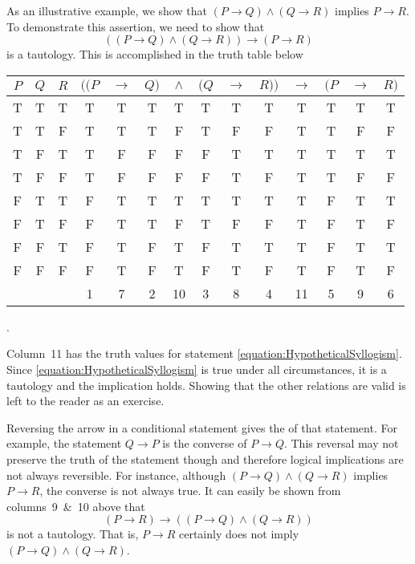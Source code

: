 As an illustrative example, we show that $(P \rightarrow Q) \wedge (Q \rightarrow R)$ implies $P \rightarrow R$.
To demonstrate this assertion, we need to show that
\begin{equation} \label{equation:HypotheticalSyllogism}
((P \rightarrow Q) \wedge (Q \rightarrow R)) \rightarrow (P \rightarrow R)
\end{equation}
is a tautology.
This is accomplished in the truth table below
\begin{center}
\begin{tabular}{|c|c|c|ccccccccccc|}
\hline
$P$ & $Q$ & $R$
& $((P$ & $\rightarrow$ & $Q)$ & $\wedge$ & $(Q$ & $\rightarrow$ & $R))$ & $\rightarrow$ & $(P$ & $\rightarrow$ & $R)$ \\
\hline
T & T & T & T & T & T & T & T & T & T & T & T & T & T \\
T & T & F & T & T & T & F & T & F & F & T & T & F & F \\
T & F & T & T & F & F & F & F & T & T & T & T & T & T \\
T & F & F & T & F & F & F & F & T & F & T & T & F & F \\
F & T & T & F & T & T & T & T & T & T & T & F & T & T \\
F & T & F & F & T & T & F & T & F & F & T & F & T & F \\
F & F & T & F & T & F & T & F & T & T & T & F & T & T \\
F & F & F & F & T & F & T & F & T & F & T & F & T & F \\
& & & 1 & 7 & 2 & 10 & 3 & 8 & 4 & 11 & 5 & 9 & 6 \\
\hline
\end{tabular} .
\end{center}
Column~11 has the truth values for statement \eqref{equation:HypotheticalSyllogism}.
Since \eqref{equation:HypotheticalSyllogism} is true under all circumstances, it is a tautology and the implication holds.
Showing that the other relations are valid is left to the reader as an exercise.

Reversing the arrow in a conditional statement gives the  of that statement.
For example, the statement $Q \rightarrow P$ is the converse of $P \rightarrow Q$.
This reversal may not preserve the truth of the statement though and therefore logical implications are not always reversible.
For instance, although $(P \rightarrow Q) \wedge (Q \rightarrow R)$ implies $P \rightarrow R$, the converse is not always true.
It can easily be shown from columns~9~\&~10 above that
\begin{equation*}
(P \rightarrow R) \rightarrow ((P \rightarrow Q) \wedge (Q \rightarrow R))
\end{equation*}
is not a tautology.
That is, $P \rightarrow R$ certainly does not imply $(P \rightarrow Q) \wedge (Q \rightarrow R)$.

